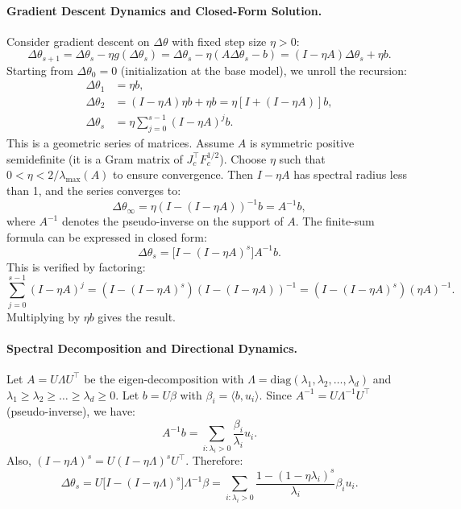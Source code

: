 \documentclass{article}
\begin{document}
\paragraph{Gradient Descent Dynamics and Closed-Form Solution.}
Consider gradient descent on \(\Delta\theta\) with fixed step size \(\eta > 0\):
\begin{equation}
\Delta\theta_{s+1} = \Delta\theta_s - \eta g(\Delta\theta_s) = \Delta\theta_s - \eta (A\Delta\theta_s - b) = (I - \eta A)\Delta\theta_s + \eta b.
\end{equation}
Starting from \(\Delta\theta_0 = 0\) (initialization at the base model), we unroll the recursion:
\begin{align}
\Delta\theta_1 &= \eta b, \\
\Delta\theta_2 &= (I - \eta A)\eta b + \eta b = \eta[I + (I - \eta A)] b, \\
\Delta\theta_s &= \eta \sum_{j=0}^{s-1} (I - \eta A)^{j} b.
\end{align}
This is a geometric series of matrices. Assume \(A\) is symmetric positive semidefinite (it is a Gram matrix of \(J_c^{\top}F_c^{1/2}\)). Choose \(\eta\) such that \(0<\eta < 2/\lambda_{\max}(A)\) to ensure convergence. Then \(I - \eta A\) has spectral radius less than 1, and the series converges to:
\begin{equation}
\Delta\theta_{\infty} = \eta (I - (I - \eta A))^{-1} b = A^{-1} b,
\end{equation}
where \(A^{-1}\) denotes the pseudo-inverse on the support of \(A\). The finite-sum formula can be expressed in closed form:
\begin{equation}
\Delta\theta_s = \big[ I - (I - \eta A)^s \big] A^{-1} b.
\end{equation}
This is verified by factoring:
\begin{equation}
\sum_{j=0}^{s-1} (I - \eta A)^j = (I - (I - \eta A)^s)(I - (I - \eta A))^{-1} = (I - (I - \eta A)^s)(\eta A)^{-1}.
\end{equation}
Multiplying by \(\eta b\) gives the result.

\paragraph{Spectral Decomposition and Directional Dynamics.}
Let \(A = U \Lambda U^{\top}\) be the eigen-decomposition with \(\Lambda = \mathrm{diag}(\lambda_1,\lambda_2,\dots,\lambda_d)\) and \(\lambda_1 \ge \lambda_2 \ge \dots \ge \lambda_d \ge 0\).  
Let \(b = U \beta\) with \(\beta_i = \langle b, u_i \rangle\). Since \(A^{-1} = U \Lambda^{-1} U^{\top}\) (pseudo-inverse), we have:
\begin{equation}
A^{-1}b = \sum_{i: \lambda_i>0} \frac{\beta_i}{\lambda_i} u_i.
\end{equation}
Also, \((I - \eta A)^s = U (I - \eta \Lambda)^s U^{\top}\). Therefore:
\begin{equation}
\Delta\theta_s = U \big[ I - (I - \eta \Lambda)^s \big] \Lambda^{-1} \beta = \sum_{i: \lambda_i>0} \frac{1 - (1 - \eta \lambda_i)^s}{\lambda_i} \beta_i u_i.
\end{equation}
\end{document}
